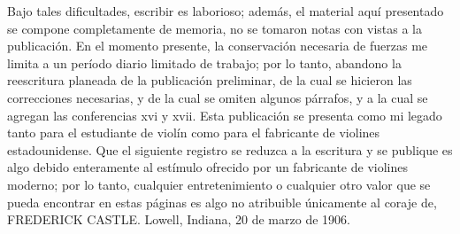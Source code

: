 Bajo tales dificultades, escribir es laborioso; además, el material aquí presentado se compone completamente de memoria, no se tomaron notas con vistas a la publicación. En el momento presente, la conservación necesaria de fuerzas me limita a un período diario limitado de trabajo; por lo tanto, abandono la reescritura planeada de la publicación preliminar, de la cual se hicieron las correcciones necesarias, y de la cual se omiten algunos párrafos, y a la cual se agregan las conferencias xvi y xvii. Esta publicación se presenta como mi legado tanto para el estudiante de violín como para el fabricante de violines estadounidense. Que el siguiente registro se reduzca a la escritura y se publique es algo debido enteramente al estímulo ofrecido por un fabricante de violines moderno; por lo tanto, cualquier entretenimiento o cualquier otro valor que se pueda encontrar en estas páginas es algo no atribuible únicamente al coraje de, FREDERICK CASTLE. Lowell, Indiana, 20 de marzo de 1906.